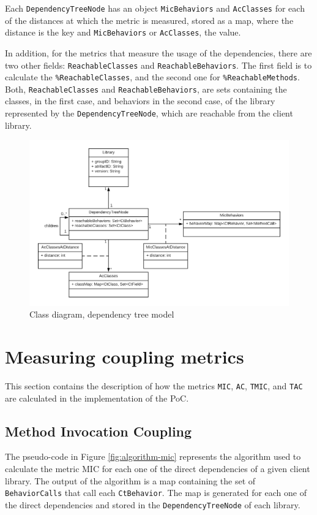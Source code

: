 Each \texttt{DependencyTreeNode} has an object \texttt{MicBehaviors} and \texttt{AcClasses} for each of the distances at which the metric is measured, stored as a map, where the distance is the key and \texttt{MicBehaviors} or \texttt{AcClasses}, the value.

In addition, for the metrics that measure the usage of the dependencies, there are two other fields: \texttt{ReachableClasses} and \texttt{ReachableBehaviors}. The first field is to calculate the \texttt{\%ReachableClasses}, and the second one for \texttt{\%ReachableMethods}. Both, \texttt{ReachableClasses} and \texttt{ReachableBehaviors}, are sets containing the classes, in the first case, and behaviors in the second case, of the library represented by the \texttt{DependencyTreeNode}, which are reachable from the client library.

\begin{figure}[ht]
\begin{center}
\includegraphics[width=\textwidth]{figures/Thesis-ModelClassDiagram.png}
\caption{Class diagram, dependency tree model}
\label{fig:class-diagram-tree}
\end{center}
\end{figure}

\section{Measuring coupling metrics}
This section contains the description of how the metrics \texttt{MIC}, \texttt{AC}, \texttt{TMIC}, and \texttt{TAC} are calculated in the implementation of the PoC.

\subsection{Method Invocation Coupling}
The pseudo-code in Figure \ref{fig:algorithm-mic} represents the algorithm used to calculate the metric MIC for each one of the direct dependencies of a given client library. The output of the algorithm is a map containing the set of \texttt{BehaviorCalls} that call each \texttt{CtBehavior}. The map is generated for each one of the direct dependencies and stored in the \texttt{DependencyTreeNode} of each library.

